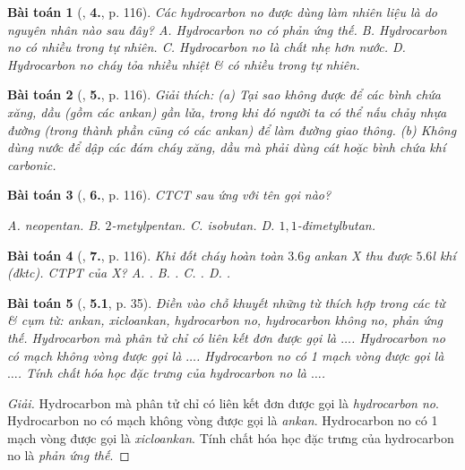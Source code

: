 \documentclass{article}
\numberwithin{equation}{section}
\newtheorem{baitoan}{Bài toán}[section]
\begin{document}
\begin{baitoan}[\cite{SGK_Hoa_Hoc_11_co_ban}, \textbf{4.}, p. 116]
	Các hydrocarbon no được dùng làm nhiên liệu là do nguyên nhân nào sau đây? {\sf A.} Hydrocarbon no có phản ứng thế. {\sf B.} Hydrocarbon no có nhiều trong tự nhiên. {\sf C.} Hydrocarbon no là chất nhẹ hơn nước. {\sf D.} Hydrocarbon no cháy tỏa nhiều nhiệt \& có nhiều trong tự nhiên. 
\end{baitoan}

\begin{baitoan}[\cite{SGK_Hoa_Hoc_11_co_ban}, \textbf{5.}, p. 116]
	Giải thích: (a) Tại sao không được để các bình chứa xăng, dầu (gồm các ankan) gần lửa, trong khi đó người ta có thể nấu chảy nhựa đường (trong thành phần cũng có các ankan) để làm đường giao thông. (b) Không dùng nước để dập các đám cháy xăng, dầu mà phải dùng cát hoặc bình chứa khí carbonic.
\end{baitoan}

\begin{baitoan}[\cite{SGK_Hoa_Hoc_11_co_ban}, \textbf{6.}, p. 116]
	CTCT sau ứng với tên gọi nào?
	\begin{center}
	\end{center}
	{\sf A.} neopentan. {\sf B.} $2$-metylpentan. {\sf C.} isobutan. {\sf D.} $1,1$-đimetylbutan.
\end{baitoan}

\begin{baitoan}[\cite{SGK_Hoa_Hoc_11_co_ban}, \textbf{7.}, p. 116]
	Khi đốt cháy hoàn toàn $3.6$\emph{g} ankan X thu được $5.6$\emph{l} khí \emph{} (đktc). CTPT của X? {\sf A.} \emph{}. {\sf B.} \emph{}. {\sf C.} \emph{}. {\sf D.} \emph{}. 
\end{baitoan}

\begin{baitoan}[\cite{SBT_Hoa_Hoc_11_co_ban}, \textbf{5.1}, p. 35]
	Điền vào chỗ khuyết những từ thích hợp trong các từ \& cụm từ: \emph{ankan, xicloankan, hydrocarbon no, hydrocarbon không no, phản ứng thế}. Hydrocarbon mà phân tử chỉ có liên kết đơn được gọi là $\ldots$. Hydrocarbon no có mạch không vòng được gọi là $\ldots$. Hydrocarbon no có 1 mạch vòng được gọi là $\ldots$. Tính chất hóa học đặc trưng của hydrocarbon no là $\ldots$.
\end{baitoan}

\begin{proof}[Giải]
	Hydrocarbon mà phân tử chỉ có liên kết đơn được gọi là \textit{hydrocarbon no}. Hydrocarbon no có mạch không vòng được gọi là \textit{ankan}. Hydrocarbon no có 1 mạch vòng được gọi là \textit{xicloankan}. Tính chất hóa học đặc trưng của hydrocarbon no là \textit{phản ứng thế}.
\end{proof}
\end{document}
